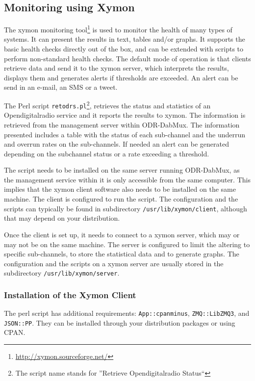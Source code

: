 \subsection{Monitoring using Xymon}
The xymon monitoring tool\footnote{\url{http://xymon.sourceforge.net/}} is used
to monitor the health of many types of systems. It can present the results in
text, tables and/or graphs. It supports the basic health checks directly out of
the box, and can be extended with scripts to perform non-standard health checks.
The default mode of operation is that clients retrieve data and send it to the
xymon server, which interprets the results, displays them and generates alerts
if thresholds are exceeded. An alert can be send in an e-mail, an SMS or a
tweet.

The Perl script \verb+retodrs.pl+\footnote{The script name stands for
''Retrieve Opendigitalradio Status``}, retrieves the status and
statistics of an Opendigitalradio service and it reports the results to xymon.
The information is retrieved from the management server within ODR-DabMux. The
information presented includes a table with the status of each sub-channel and
the underrun and overrun rates on the sub-channels. If needed an alert can be
generated depending on the subchannel status or a rate exceeding a threshold.

The script needs to be installed on the same server running ODR-DabMux, as the
management service within it is only accessible from the same computer. This
implies that the xymon client software also needs to be installed on the same
machine. The client is configured to run the script.
The configuration and the scripts can typically be found in subdirectory
\verb+/usr/lib/xymon/client+, although that may depend on your distribution.

Once the client is set up, it needs to connect to a xymon server, which may or
may not be on the same machine.
The server is configured to limit the altering to specific sub-channels, to
store the statistical data and to generate graphs.
The configuration and the scripts on a xymon server are usually stored in the
subdirectory \verb+/usr/lib/xymon/server+.


\subsubsection{Installation of the Xymon Client}

The perl script has additional requirements:
\texttt{App::cpanminus}, \texttt{ZMQ::LibZMQ3}, and \texttt{JSON::PP}. They can
be installed through your distribution packages or using CPAN.

